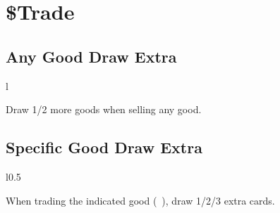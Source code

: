 \documentclass[letterpaper,landscape,twocolumn,8pt]{extarticle}
\newcommand{\inline}[1]{\scalerel*{#1}{M}}
\begin{document}
\section*{\$\enspace{}Trade}%

\begin{minipage}[t]{0.31\columnwidth}
\subsection*{Any Good Draw Extra}

\setlength{\intextsep}{0pt}%

\begin{wrapfigure}{l}{\columnwidth}
    
    
\end{wrapfigure}

Draw 1/2 more goods when selling any good.
\end{minipage}
\begin{minipage}[t]{\calc{1/3}\columnwidth}
\subsection*{Specific Good Draw Extra}

\setlength{\intextsep}{0pt}%

\begin{wrapfigure}{l}{0.5\columnwidth}
    
    
    \smallbreak{}
    
    
    \smallbreak{}
    
    
\end{wrapfigure}
When trading the indicated good
\mbox{(\inline{}
\inline{}
\inline{}
\inline{})}, draw 1/2/3
extra cards.
\end{minipage}
\end{document}

